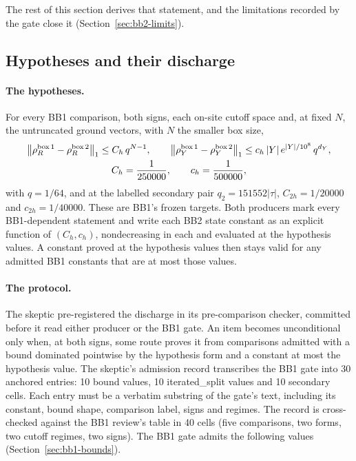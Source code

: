 \enlargethispage{\baselineskip}%
The rest of this section derives that statement, and the limitations recorded
by the gate close it (Section~\ref{sec:bb2-limits}).

\subsection{Hypotheses and their discharge}
\label{sec:bb2-discharge}
\paragraph{The hypotheses.} For every BB1 comparison, both signs, each
on-site cutoff space and, at fixed $N$, the untruncated ground vectors, with
$N$ the smaller box size,
\begin{equation}
 \begin{gathered}
 \left\lVert\rho^{\rm box\,1}_R-\rho^{\rm box\,2}_R\right\rVert_1\le C_h\,q^{N-1},\qquad
 \left\lVert\rho^{\rm box\,1}_Y-\rho^{\rm box\,2}_Y\right\rVert_1\le c_h\,|Y|\,e^{|Y|/10^8}\,q^{d_Y},\\
 C_h=\frac1{250000},\qquad c_h=\frac1{500000},
 \end{gathered}
 \label{eq:bb2-hypotheses}
\end{equation}
with $q=1/64$, and at the labelled secondary pair $q_2=151552|\tau|$,
$C_{2h}=1/20000$ and $c_{2h}=1/40000$. These are BB1's frozen targets. Both
producers mark every BB1-dependent statement
 and write each BB2 state constant as an
explicit function of $(C_h,c_h)$, nondecreasing in each and evaluated at the
hypothesis values. A constant proved at the hypothesis values then stays
valid for any admitted BB1 constants that are at most those values.

\paragraph{The protocol.} The skeptic pre-registered the discharge in its
pre-comparison checker, committed before it read either producer or the BB1
gate. An item becomes unconditional only when, at both signs, some route
proves it from comparisons admitted with a bound dominated pointwise by the
hypothesis form and a constant at most the hypothesis value. The skeptic's
admission record transcribes the BB1 gate into 30 anchored entries: 10 bound
values, 10 iterated\_split values and 10 secondary cells. Each entry must be
a verbatim substring of the gate's text, including its constant, bound shape,
comparison label, signs and regimes. The record is cross-checked against the
BB1 review's table in 40 cells (five comparisons, two forms, two cutoff
regimes, two signs). The BB1 gate admits the following values
(Section~\ref{sec:bb1-bounds}).

